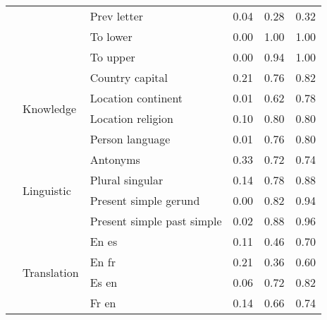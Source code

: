 \begin{center}
\begin{longtable}{lllrrr}
 &  & Prev letter & 0.04 & 0.28 & 0.32 \\
 &  & To lower & 0.00 & 1.00 & 1.00 \\
 &  & To upper & 0.00 & 0.94 & 1.00 \\
\cline{2-6}
 & \multirow[t]{4}{*}{Knowledge} & Country capital & 0.21 & 0.76 & 0.82 \\
 &  & Location continent & 0.01 & 0.62 & 0.78 \\
 &  & Location religion & 0.10 & 0.80 & 0.80 \\
 &  & Person language & 0.01 & 0.76 & 0.80 \\
\cline{2-6}
 & \multirow[t]{4}{*}{Linguistic} & Antonyms & 0.33 & 0.72 & 0.74 \\
 &  & Plural singular & 0.14 & 0.78 & 0.88 \\
 &  & Present simple gerund & 0.00 & 0.82 & 0.94 \\
 &  & Present simple past simple & 0.02 & 0.88 & 0.96 \\
\cline{2-6}
 & \multirow[t]{4}{*}{Translation} & En es & 0.11 & 0.46 & 0.70 \\
 &  & En fr & 0.21 & 0.36 & 0.60 \\
 &  & Es en & 0.06 & 0.72 & 0.82 \\
 &  & Fr en & 0.14 & 0.66 & 0.74 \\
\cline{1-6} \cline{2-6}
\bottomrule
\end{longtable}

\end{center}
\twocolumn
